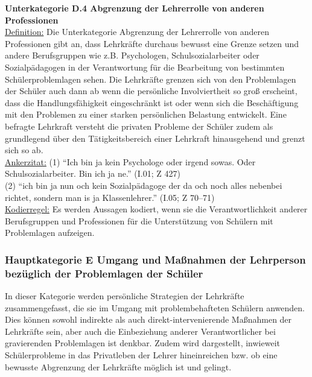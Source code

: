\noindent
\textbf{Unterkategorie D.4 Abgrenzung der Lehrerrolle von anderen Professionen}\\
\underline{Definition:} Die Unterkategorie Abgrenzung der Lehrerrolle von anderen Professionen gibt an, dass Lehrkräfte durchaus bewusst eine Grenze setzen und andere Berufsgruppen wie z.B. Psychologen, Schulsozialarbeiter oder Sozialpädagogen in der Verantwortung für die Bearbeitung von bestimmten Schülerproblemlagen sehen. Die Lehrkräfte grenzen sich von den Problemlagen der Schüler auch dann ab wenn die persönliche Involviertheit so groß erscheint, dass die Handlungsfähigkeit eingeschränkt ist oder wenn sich die Beschäftigung mit den Problemen zu einer starken persönlichen Belastung entwickelt. Eine befragte Lehrkraft versteht die privaten Probleme der Schüler zudem als grundlegend über den Tätigkeitsbereich einer Lehrkraft hinausgehend und grenzt sich so ab.\\
\underline{Ankerzitat:} (1) "`Ich bin ja kein Psychologe oder irgend sowas. Oder Schulsozialarbeiter. Bin ich ja ne."' (I.01; Z 427)\\ (2) "`ich bin ja nun och kein Sozialpädagoge der da och noch alles nebenbei richtet, sondern man is ja Klassenlehrer."' (I.05; Z 70--71)\\
\underline{Kodierregel:} Es werden Aussagen kodiert, wenn sie die Verantwortlichkeit anderer Berufsgruppen und Professionen für die Unterstützung von Schülern mit Problemlagen aufzeigen.

\subsubsection{Hauptkategorie E Umgang und Maßnahmen der Lehrperson bezüglich der Problemlagen der Schüler}
\label{sec:HauptkategorieEUmgangUndMassnahmenDerLehrpersonBezüglichDerProblemlagenDerSchüler}

In dieser Kategorie werden persönliche Strategien der Lehrkräfte zusammengefasst, die sie im Umgang mit problembehafteten Schülern anwenden. Dies können sowohl indirekte als auch direkt-intervenierende Maßnahmen der Lehrkräfte sein, aber auch die Einbeziehung anderer Verantwortlicher bei gravierenden Problemlagen ist denkbar. Zudem wird dargestellt, inwieweit Schülerprobleme in das Privatleben der Lehrer hineinreichen bzw. ob eine bewusste Abgrenzung der Lehrkräfte möglich ist und gelingt.\\

